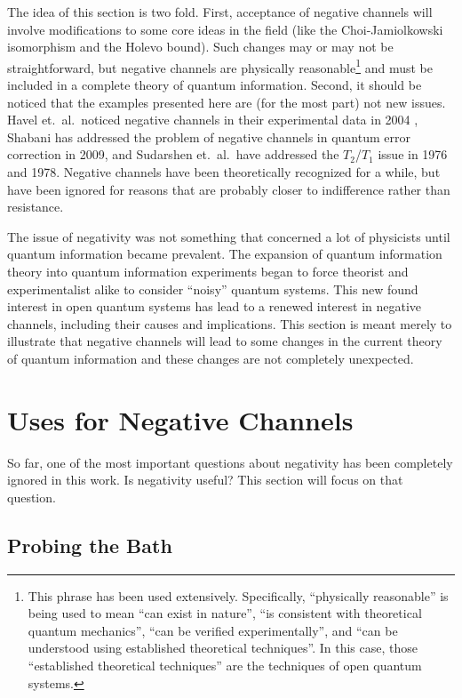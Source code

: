 The idea of this section is two fold.  First, acceptance of negative channels will involve modifications to some core ideas in the field (like the Choi-Jamiolkowski isomorphism and the Holevo bound).  Such changes may or may not be straightforward, but negative channels are physically reasonable\footnote{This phrase has been used extensively.  Specifically, ``physically reasonable'' is being used to mean ``can exist in nature'', ``is consistent with theoretical quantum mechanics'', ``can be verified experimentally'', and ``can be understood using established theoretical techniques''.  In this case, those ``established theoretical techniques'' are the techniques of open quantum systems.} and must be included in a complete theory of quantum information.  Second, it should be noticed that the examples presented here are (for the most part) not new issues.  Havel et.\ al.\ noticed negative channels in their experimental data in 2004 \cite{Havel2003}, Shabani has addressed the problem of negative channels in quantum error correction in 2009, and Sudarshen et.\ al.\ have addressed the $T_2$/$T_1$ issue in 1976 and 1978.  Negative channels have been theoretically recognized for a while, but have been ignored for reasons that are probably closer to indifference rather than resistance.  

The issue of negativity was not something that concerned a lot of physicists until quantum information became prevalent.  The expansion of quantum information theory into quantum information experiments began to force theorist and experimentalist alike to consider ``noisy'' quantum systems.  This new found interest in open quantum systems has lead to a renewed interest in negative channels, including their causes and implications.  This section is meant merely to illustrate that negative channels will lead to some changes in the current theory of quantum information and these changes are not completely unexpected.

\chapter{Uses for Negative Channels}

So far, one of the most important questions about negativity has been completely ignored in this work.  Is negativity useful?  This section will focus on that question.

\section{Probing the Bath}
